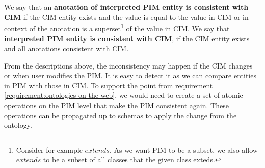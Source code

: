 



\bigskip

\begin{definition}[consistency]
    We say that an \textbf{anotation of interpreted PIM entity is consistent with CIM} if the CIM entity exists and the value is equal to the value in CIM or in context of the anotation is a superset\footnote{Consider for example $extends$. As we want PIM to be a subset, we also allow $extends$ to be a subset of all classes that the given class exteds.} of the value in CIM. We say that \textbf{interpreted PIM entity is consistent with CIM}, if the CIM entity exists and all anotations consistent with CIM.
\end{definition}

From the descriptions above, the inconsistency may happen if the CIM changes or when user modifies the PIM. It is easy to detect it as we can compare entities in PIM with those in CIM. To support the  point from requirement \ref{requirement:ontologies-on-the-web}, we would need to create a set of atomic operations on the PIM level that make the PIM consistent again. These operations can be propagated up to schemas to apply the change from the ontology.

